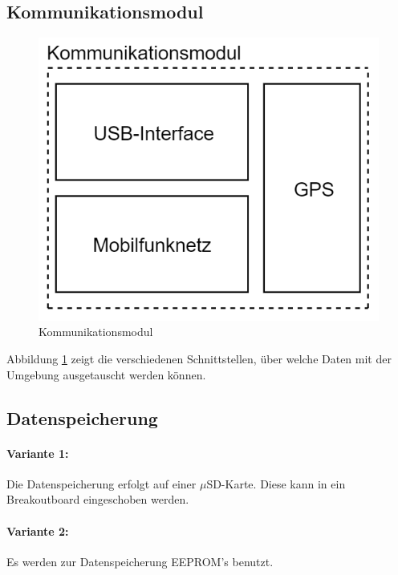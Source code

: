 \subsection{Kommunikationsmodul}
\begin{figure}[h]
\centering
\includegraphics[scale=0.7]{graphics/Kommunikationsmodul.PNG}
\caption{Kommunikationsmodul}
\label{fig:kommunikationsmodul}
\end{figure}
Abbildung \ref{fig:kommunikationsmodul} zeigt die verschiedenen Schnittstellen, über welche Daten mit der Umgebung ausgetauscht werden können.\\
\newpage
\subsection{Datenspeicherung}
\paragraph{Variante 1:}

Die Datenspeicherung erfolgt auf einer $\mu$SD-Karte. Diese kann in ein Breakoutboard eingeschoben werden.\\

\paragraph{Variante 2:}

Es werden zur Datenspeicherung EEPROM's benutzt.\\

